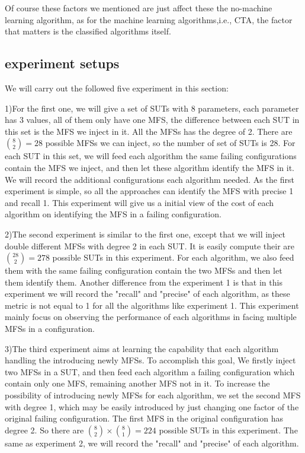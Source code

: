 \documentclass[10pt,journal,cspaper,compsoc]{IEEEtran}
\begin{document}
Of course these factors we mentioned are just affect these the no-machine learning algorithm, as for the machine learning algorithms,i.e., CTA, the factor that matters is the classified algorithms itself.


\subsection{experiment setups}
We will carry out the followed five experiment in this section:

1)For the first one, we will give a set of SUTs with 8 parameters, each parameter has 3 values, all of them only have one MFS, the difference between each SUT in this set is the MFS we inject in it. All the MFSs has the degree of 2. There are $\binom{8}{2} = 28$ possible MFSs we can inject, so the number of set of SUTs is 28. For each SUT in this set, we will feed each algorithm the same failing configurations contain the MFS we inject, and then let these algorithm identify the MFS in it. We will record the additional configurations each algorithm needed. As the first experiment is simple, so all the approaches can identify the MFS with precise 1 and recall 1. This experiment will give us a initial view of the cost of each algorithm on identifying the MFS in a failing configuration.

2)The second experiment is similar to the first one, except that we will inject double different MFSs with degree 2 in each SUT. It is easily compute their are  $\binom{28}{2} = 278$  possible SUTs in this experiment. For each algorithm, we also feed them with the same failing configuration contain the two MFSs and then let them identify them. Another difference from the experiment 1 is that in this experiment we will record the "recall" and "precise" of each algorithm, as these metric is not equal to 1 for all the algorithms like experiment 1. This experiment mainly focus on observing the performance of each algorithms in facing multiple MFSs in a configuration.

3)The third experiment aims at learning the capability that each algorithm handling the introducing newly MFSs. To accomplish this goal, We firstly inject two MFSs in a SUT, and then feed each algorithm a failing configuration which contain only one MFS,  remaining another MFS not in it. To increase the possibility of introducing newly MFSs for each algorithm, we set the second MFS with degree 1, which may be easily introduced by just changing one factor of the original failing configuration.  The first MFS in the original configuration has degree 2. So there are  $\binom{8}{2} \times \binom{8}{1} = 224$ possible SUTs in this experiment. The same as experiment 2, we will record the "recall" and "precise" of each algorithm.
\end{document}
